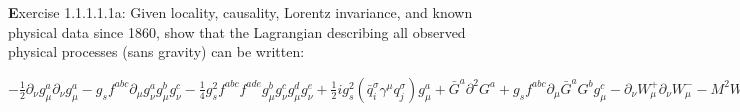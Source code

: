 \documentclass[14pt]{article}
\begin{document}
\textbf
Exercise 1.1.1.1.1a:  Given locality, causality, Lorentz invariance, and
known physical data 
since 1860, show that the Lagrangian describing all observed physical
processes (sans gravity) can be written:

\large
\begin{center}
\begin{math}
-\frac{1}{2}\partial_{\nu}g^{a}_{\mu}\partial_{\nu}g^{a}_{\mu}
-g_{s}f^{abc}\partial_{\mu}g^{a}_{\nu}g^{b}_{\mu}g^{c}_{\nu}
-\frac{1}{4}g^{2}_{s}f^{abc}f^{ade}g^{b}_{\mu}g^{c}_{\nu}g^{d}_{\mu}g^{e}_{\nu}
+\frac{1}{2}ig^{2}_{s}(\bar{q}^{\sigma}_{i}\gamma^{\mu}q^{\sigma}_{j})g^{a}_{\mu}
+\bar{G}^{a}\partial^{2}G^{a}+g_{s}f^{abc}\partial_{\mu}\bar{G}^{a}G^{b}g^{c}_{\mu}
-\partial_{\nu}W^{+}_{\mu}\partial_{\nu}W^{-}_{\mu}-M^{2}W^{+}_{\mu}W^{-}_{\mu}
-\frac{1}{2}\partial_{\nu}Z^{0}_{\mu}\partial_{\nu}Z^{0}_{\mu}-\frac{1}{2c^{2}_{w}}
M^{2}Z^{0}_{\mu}Z^{0}_{\mu}
-\frac{1}{2}\partial_{\mu}A_{\nu}\partial_{\mu}A_{\nu}
-\frac{1}{2}\partial_{\mu}H\partial_{\mu}H-\frac{1}{2}m^{2}_{h}H^{2}
-\partial_{\mu}\phi^{+}\partial_{\mu}\phi^{-}-M^{2}\phi^{+}\phi^{-}
-\frac{1}{2}\partial_{\mu}\phi^{0}\partial_{\mu}\phi^{0}-\frac{1}{2c^{2}_{w}}M\phi^{0}\phi^{0}
-\beta_{h}[\frac{2M^{2}}{g^{2}}+\frac{2M}{g}H+\frac{1}{2}(H^{2}+\phi^{0}\phi^{0}+2\phi^{+}\phi^{-%
})]+\frac{2M^{4}}{g^{2}}\alpha_{h}
-igc_{w}[\partial_{\nu}Z^{0}_{\mu}(W^{+}_{\mu}W^{-}_{\nu}-W^{+}_{\nu}W^{-}_{\mu})
-Z^{0}_{\nu}(W^{+}_{\mu}\partial_{\nu}W^{-}_{\mu}-W^{-}_{\mu}\partial_{\nu}W^{+}_{\mu})
+Z^{0}_{\mu}(W^{+}_{\nu}\partial_{\nu}W^{-}_{\mu}-W^{-}_{\nu}\partial_{\nu}W^{+}_{\mu})]
-igs_{w}[\partial_{\nu}A_{\mu}(W^{+}_{\mu}W^{-}_{\nu}-W^{+}_{\nu}W^{-}_{\mu})
-A_{\nu}(W^{+}_{\mu}\partial_{\nu}W^{-}_{\mu}-W^{-}_{\mu}\partial_{\nu}W^{+}_{\mu})
+A_{\mu}(W^{+}_{\nu}\partial_{\nu}W^{-}_{\mu}-W^{-}_{\nu}\partial_{\nu}W^{+}_{\mu})]
-\frac{1}{2}g^{2}W^{+}_{\mu}W^{-}_{\mu}W^{+}_{\nu}W^{-}_{\nu}+\frac{1}{2}g^{2}
W^{+}_{\mu}W^{-}_{\nu}W^{+}_{\mu}W^{-}_{\nu}
+g^2c^{2}_{w}(Z^{0}_{\mu}W^{+}_{\mu}Z^{0}_{\nu}W^{-}_{\nu}-Z^{0}_{\mu}Z^{0}_{\mu}W^{+}_{\nu}
W^{-}_{\nu})
+g^2s^{2}_{w}(A_{\mu}W^{+}_{\mu}A_{\nu}W^{-}_{\nu}-A_{\mu}A_{\mu}W^{+}_{\nu}
W^{-}_{\nu})
+g^{2}s_{w}c_{w}[A_{\mu}Z^{0}_{\nu}(W^{+}_{\mu}W^{-}_{\nu}-W^{+}_{\nu}W^{-}_{\mu})-%
2A_{\mu}Z^{0}_{\mu}W^{+}_{\nu}W^{-}_{\nu}]
-g\alpha[H^3+H\phi^{0}\phi^{0}+2H\phi^{+}\phi^{-}]
-\frac{1}{8}g^{2}\alpha_{h}[H^4+(\phi^{0})^{4}+4(\phi^{+}\phi^{-})^{2}+4(\phi^{0})^{2}
\phi^{+}\phi^{-}+4H^{2}\phi^{+}\phi^{-}+2(\phi^{0})^{2}H^{2}]
-gMW^{+}_{\mu}W^{-}_{\mu}H-\frac{1}{2}g\frac{M}{c^{2}_{w}}Z^{0}_{\mu}Z^{0}_{\mu}H
-\frac{1}{2}ig[W^{+}_{\mu}(\phi^{0}\partial_{\mu}\phi^{-}-\phi^{-}\partial_{\mu}\phi^{0})

\end{math}
\end{center}
\end{document}
